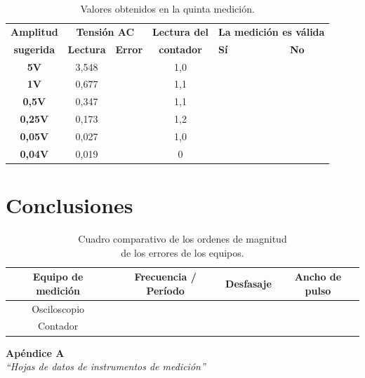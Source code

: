 \documentclass{article}
\newcommand{\tick}{\ding{52}}
\begin{document}
\begin{table}[!hbt]
	\begin{center}

		\begin{tabular}{|c|c|c|c|>{\centering}p{1.65cm}|c|} \hline
			\textbf{Amplitud} & \multicolumn{2}{c|}{\textbf{Tensión AC}} & \textbf{Lectura del} & \multicolumn{2}{c|}{\textbf{La medición es válida}} \\\cline{2-3}\cline{5-6}
			\textbf{sugerida} & \textbf{Lectura} & \textbf{Error} & \textbf{contador} & \textbf{Sí} & \textbf{No} \\\hline
			
			\textbf{5V} & 3,548 &  & 1,0 & \tick &  \\\hline
			\textbf{1V} & 0,677 &  & 1,1 &  &  \\\hline
			\textbf{0,5V} & 0,347 &  & 1,1 &  &  \\\hline
			\textbf{0,25V} & 0,173 &  & 1,2 &  &  \\\hline
			\textbf{0,05V} & 0,027 &  & 1,0 &  &  \\\hline
			\textbf{0,04V} & 0,019 &  & 0 &  &  \\\hline

		\end{tabular}

	\caption{Valores obtenidos en la quinta medición.}
	\end{center}
\end{table}
\medskip




\section{Conclusiones}

\begin{table}[!hbt]
	\begin{center}
		\begin{tabular}{|c|c|c|c|} \hline
			\textbf{Equipo de medición} & \textbf{Frecuencia / Período} & \textbf{Desfasaje} & \textbf{Ancho de pulso} \\\hline
			Osciloscopio &  &  &  \\\hline
			Contador &  &  &  \\\hline
		\end{tabular}

	\caption{Cuadro comparativo de los ordenes de magnitud\\ de los errores de los equipos.}
	\end{center}
\end{table}
\medskip
	


\newpage \textit{}
\newpage



\newpage
\vspace*{4cm}
\begin{center}
	\textbf{\Huge{Apéndice A}} \\
	\bigskip\bigskip
	\Large{\textit{``Hojas de datos de instrumentos de medición''}}
\end{center}


\newpage \textit{}
\newpage
\end{document}

